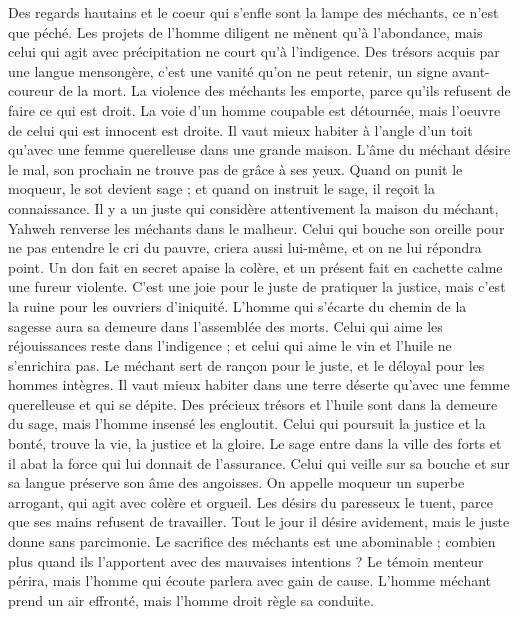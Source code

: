 \begin{multicols}{2}
Des regards hautains et le coeur qui s’enfle sont la lampe des méchants, ce n'est que péché.
Les projets de l’homme diligent ne mènent qu’à l'abondance, mais celui qui agit avec précipitation ne court qu’à l'indigence.
Des trésors acquis par une langue mensongère, c'est une vanité qu’on ne peut retenir, un signe avant-coureur de la mort.
La violence des méchants les emporte, parce qu'ils refusent de faire ce qui est droit.
La voie d’un homme coupable est détournée, mais l'oeuvre de celui qui est innocent est droite.
Il vaut mieux habiter à l’angle d'un toit qu’avec une femme querelleuse dans une grande maison.
L'âme du méchant désire le mal, son prochain ne trouve pas de grâce à ses yeux.
Quand on punit le moqueur, le sot devient sage ; et quand on instruit le sage, il reçoit la connaissance.
Il y a un juste qui considère attentivement la maison du méchant, Yahweh renverse les méchants dans le malheur.
Celui qui bouche son oreille pour ne pas entendre le cri du pauvre, criera aussi lui-même, et on ne lui répondra point.
Un don fait en secret apaise la colère, et un présent fait en cachette calme une fureur violente.
C'est une joie pour le juste de pratiquer la justice, mais c'est la ruine pour les ouvriers d'iniquité.
L'homme qui s’écarte du chemin de la sagesse aura sa demeure dans l'assemblée des morts.
Celui qui aime les réjouissances reste dans l’indigence ; et celui qui aime le vin et l’huile ne s'enrichira pas.
Le méchant sert de rançon pour le juste, et le déloyal pour les hommes intègres.
Il vaut mieux habiter dans une terre déserte qu'avec une femme querelleuse et qui se dépite.
Des précieux trésors et l'huile sont dans la demeure du sage, mais l'homme insensé les engloutit.
Celui qui poursuit la justice et la bonté, trouve la vie, la justice et la gloire.
Le sage entre dans la ville des forts et il abat la force qui lui donnait de l’assurance.
Celui qui veille sur sa bouche et sur sa langue préserve son âme des angoisses.
On appelle moqueur un superbe arrogant, qui agit avec colère et orgueil.
Les désirs du paresseux le tuent, parce que ses mains refusent de travailler.
Tout le jour il désire avidement, mais le juste donne sans parcimonie.
Le sacrifice des méchants est une abominable ; combien plus quand ils l'apportent avec des mauvaises intentions ?
Le témoin menteur périra, mais l'homme qui écoute parlera avec gain de cause.
L'homme méchant prend un air effronté, mais l'homme droit règle sa conduite.

\end{multicols}
